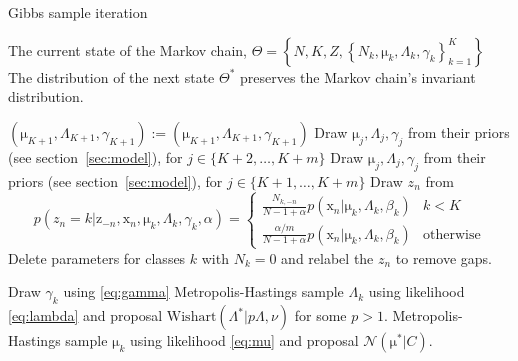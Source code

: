 \documentclass[english]{article}
\newcommand{\+}[1]{\ensuremath{\boldsymbol{\mathrm{#1}}}}
\begin{document}
\begin{algorithm}
\caption{Gibbs sample iteration}\label{alg:gibbs}
\begin{algorithmic}
\Require The current state of the Markov chain, $\Theta = \left\{ N, K, Z, \left\{ N_k, \+\mu_k, \Lambda_k, \gamma_k \right\}_{k=1}^K  \right\}$
\Ensure The distribution of the next state $\Theta^{*}$ preserves the Markov chain's invariant distribution.
\Statex

    \State $\left( \+\mu_{K+1}, \Lambda_{K+1}, \gamma_{K+1} \right) := \left( \+\mu_{K+1}, \Lambda_{K+1}, \gamma_{K+1} \right)$ 
    \State Draw $\+\mu_j, \Lambda_j, \gamma_j$ from their priors (see section~\ref{sec:model}), for $j \in \{K+2, \ldots, K+m\}$
  \Else
    \State Draw $\+\mu_j, \Lambda_j, \gamma_j$ from their priors (see section~\ref{sec:model}), for $j \in \{K+1, \ldots, K+m\}$
  \EndIf
  \State Draw $z_n$ from 
  \[
  p(z_{n}=k|\+{z}_{-n},\+x_n,\+\mu_k,\Lambda_k,\gamma_k,\alpha)=\begin{cases}
  \frac{N_{k,-n}}{N-1+\alpha} p(\+x_n | \+\mu_k, \Lambda_k, \beta_k) & k < K\\
  \frac{\alpha / m}{N-1+\alpha} p(\+x_n | \+\mu_k, \Lambda_k, \beta_k) & \text{otherwise}
  \end{cases} \label{eq:nealalg8}
  \]
  \State Delete parameters for classes $k$ with $N_k = 0$ and relabel the $z_n$ to remove gaps.
\EndFor

  \State Draw $\gamma_k$ using \eqref{eq:gamma}
  \State Metropolis-Hastings sample $\Lambda_k$ using likelihood \eqref{eq:lambda} and proposal $\text{Wishart}(\Lambda^{*} | p \Lambda, \nu)$ for some $p > 1$.
  \State Metropolis-Hastings sample $\+\mu_k$ using likelihood \eqref{eq:mu} and proposal $\mathcal{N}( \+\mu^{*} | C )$.
\EndFor

\end{algorithmic}
\end{algorithm}
\end{document}
